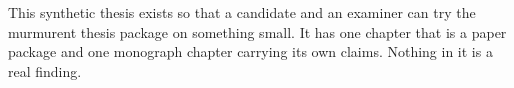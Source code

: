 This synthetic thesis exists so that a candidate and an examiner can try the
murmurent thesis package on something small. It has one chapter that is a paper
package and one monograph chapter carrying its own claims. Nothing in it is a
real finding.
